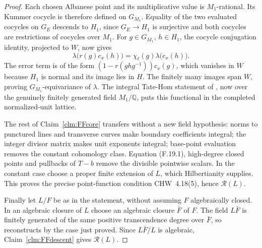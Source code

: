 \documentclass[11pt]{article}
\begin{document}
\begin{proof}
Each chosen Albanese point and its multiplicative value is
\(M_1\)-rational. Its Kummer cocycle is therefore defined on
\(G_{M_1}\). Equality of the two evaluated cocycles on
\(G_E\) descends to \(H_1\), since \(G_E\to H_1\) is
surjective and both cocycles are restrictions of cocycles over
\(M_1\). For \(g\in G_{M_1}\), \(h\in H_1\), the
cocycle conjugation identity, projected to \(W\), now gives
\[
 \lambda\bigl(r(g)c_x(h)\bigr)
             =\chi_\ell(g)\lambda\bigl(c_x(h)\bigr).
\]
The error term is of the form
\((1-r(ghg^{-1}))c_x(g)\), which vanishes in \(W\)
because \(H_1\) is normal and its image lies in \(H\).
The finitely many images span \(W\), proving
\(G_{M_1}\)-equivariance of \(\lambda\).
The integral Tate-Hom statement of
\citet[Section~1.4]{FF_Jossen2014}, now over the genuinely
finitely generated field \(M_1/\mathbb Q\), puts this
functional in the completed normalized-unit lattice.

The rest of Claim~\ref{clm:FFcore} transfers without a new
field hypothesis: norms to punctured lines and transverse curves
make boundary coefficients integral; the integer divisor matrix
makes unit exponents integral; base-point evaluation removes the
constant cohomology class. Equation (F.19.1), high-degree closed
points and pullbacks of \(T-b\) remove the divisible pointwise
scalars. In the constant case choose a proper finite extension of
\(L\), which Hilbertianity supplies. This proves the precise
point-function condition CHW~4.18(5), hence \(\mathcal R(L)\).

Finally let \(L/F\) be as in the statement, without assuming
\(F\) algebraically closed. In an algebraic closure of \(L\)
choose an algebraic closure \(\bar F\) of \(F\). The field
\(L\bar F\) is finitely generated of the same positive
transcendence degree over \(\bar F\), so reconstructs by the
case just proved. Since \(L\bar F/L\) is algebraic,
Claim~\ref{clm:FFdescent} gives \(\mathcal R(L)\).
\end{proof}
\end{document}
